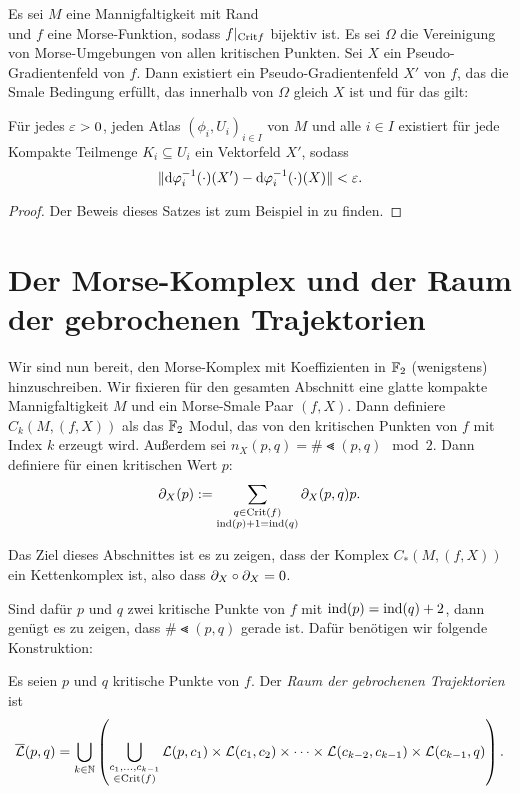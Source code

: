 \begin{theorem}
    Es sei $M$ eine Mannigfaltigkeit mit Rand  \\
    und $f$ eine Morse-Funktion, sodass $f|_{{ \operatorname{Crit} }{f}}$ bijektiv ist. Es sei $\Omega$ die Vereinigung 
    von Morse-Umgebungen von allen kritischen Punkten. Sei $X$ ein Pseudo-Gradientenfeld von $f$. 
    Dann existiert ein Pseudo-Gradientenfeld $X'$ von $f$, das die Smale Bedingung erfüllt, das 
    innerhalb von $\Omega$ gleich $X$ ist und für das gilt:

    Für jedes $\varepsilon > 0$, jeden Atlas $(\phi_i, U_i)_{i \in I}$ von $M$ und alle $i \in I$ existiert 
    für jede Kompakte Teilmenge $K_i \subseteq U_i$ ein Vektorfeld $X'$, sodass 
    \[ \| { \operatorname{d} } \varphi_i^{-1} (\cdot) (X') - { \operatorname{d} } \varphi_i^{-1} (\cdot) (X) \| < \varepsilon . \]
\end{theorem}

\begin{proof}
     Der Beweis dieses Satzes ist zum Beispiel in \cite{audin} zu finden.
\end{proof}

\section{Der Morse-Komplex und der Raum der gebrochenen Trajektorien}

Wir sind nun bereit, den Morse-Komplex mit Koeffizienten in ${ \mathbb F }_2$ (wenigstens) hinzuschreiben.
Wir fixieren für den gesamten Abschnitt eine glatte kompakte Mannigfaltigkeit $M$ und ein
Morse-Smale Paar $(f, X)$. Dann definiere
$C_k (M, (f, X))$ als das ${ \mathbb F }_2$ Modul, das von den kritischen Punkten von $f$ mit Index $k$ 
erzeugt wird. Außerdem sei $n_X(p, q) = \# \Lt (p, q) \mod 2$. Dann definiere für einen kritischen Wert
$p$:
\[ { \partial }_X (p) := \sum_{\substack{ q \in { \operatorname{Crit} }(f) \\ { \operatorname{ind} } (p) + 1 = { \operatorname{ind} } (q) }} { \partial }_X(p, q)p . \]

Das Ziel dieses Abschnittes ist es zu zeigen, dass der Komplex $C_{\ast}(M, (f, X))$ ein Kettenkomplex
ist, also dass ${ \partial }_X \circ { \partial }_X = 0$. 

Sind dafür $p$ und $q$ zwei kritische Punkte von $f$ mit ${ \operatorname{ind} } (p) = { \operatorname{ind} } (q) + 2$, dann genügt es 
zu zeigen, dass $\# \Lt (p, q)$ gerade ist. Dafür benötigen wir folgende Konstruktion:

\begin{definition}
    \label{def: raum der gebrochenen trajektorien}
    Es seien $p$ und $q$ kritische Punkte von $f$. Der \textit{Raum der gebrochenen Trajektorien} ist
    \[ {\overline{\mathcal{L}} } (p, q) = 
        \bigcup_{k \in { \mathbb N }} \left( \bigcup_{\substack{c_1, \dots, c_{k - 1} \\ \in { \operatorname{Crit} }(f)}} 
            { \mathcal{L} } (p, c_1) \times { \mathcal{L} } (c_1, c_2) \times \dots 
                \times { \mathcal{L} } (c_{k - 2}, c_{k - 1}) \times { \mathcal{L} } (c_{k - 1}, q) \right) . \]
\end{definition}

